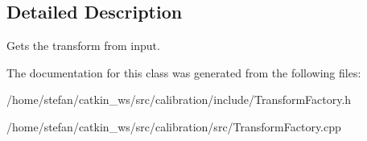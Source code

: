\subsection{\-Detailed \-Description}
\-Gets the transform from input. 

\-The documentation for this class was generated from the following files\-:\begin{DoxyCompactItemize}
\item 
/home/stefan/catkin\-\_\-ws/src/calibration/include/\-Transform\-Factory.\-h\item 
/home/stefan/catkin\-\_\-ws/src/calibration/src/\-Transform\-Factory.\-cpp\end{DoxyCompactItemize}

